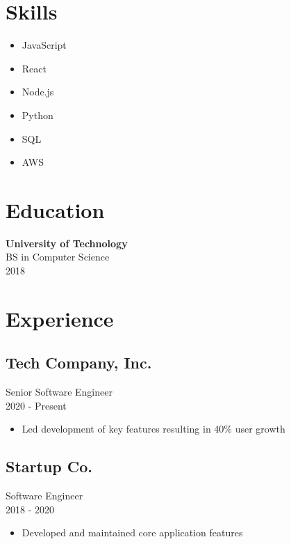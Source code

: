 \documentclass[11pt,a4paper]{article}
\begin{document}
\begin{minipage}[t]{0.3\textwidth}
    \section*{\textcolor{primary}{Skills}}
    \begin{itemize}[leftmargin=*]
        \item JavaScript
        \item React
        \item Node.js
        \item Python
        \item SQL
        \item AWS
    \end{itemize}

    \section*{\textcolor{primary}{Education}}
    \textbf{University of Technology}\\
    BS in Computer Science\\
    \textcolor{subtext}{2018}
\end{minipage}
\hfill
\begin{minipage}[t]{0.65\textwidth}
    \section*{\textcolor{primary}{Experience}}
    
    \subsection*{Tech Company, Inc.}
    \textcolor{accent}{Senior Software Engineer}\\
    \textcolor{subtext}{2020 - Present}\\[4pt]
    \begin{itemize}[leftmargin=*]
        \item Led development of key features resulting in 40\% user growth
    \end{itemize}

    \subsection*{Startup Co.}
    \textcolor{accent}{Software Engineer}\\
    \textcolor{subtext}{2018 - 2020}\\[4pt]
    \begin{itemize}[leftmargin=*]
        \item Developed and maintained core application features
    \end{itemize}
\end{minipage}
\end{document}
